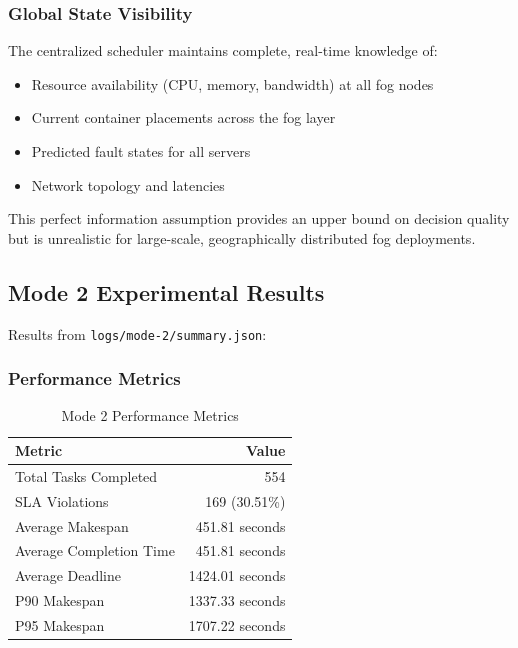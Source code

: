 \documentclass[12pt,a4paper]{article}
\begin{document}
\subsubsection{Global State Visibility}

The centralized scheduler maintains complete, real-time knowledge of:
\begin{itemize}
    \item Resource availability (CPU, memory, bandwidth) at all fog nodes
    \item Current container placements across the fog layer
    \item Predicted fault states for all servers
    \item Network topology and latencies
\end{itemize}

This perfect information assumption provides an upper bound on decision quality but is unrealistic for large-scale, geographically distributed fog deployments.

\subsection{Mode 2 Experimental Results}

Results from \texttt{logs/mode-2/summary.json}:

\subsubsection{Performance Metrics}

\begin{table}[h]
\centering
\begin{tabular}{@{}lr@{}}
\toprule
\textbf{Metric} & \textbf{Value} \\ \midrule
Total Tasks Completed & 554 \\
SLA Violations & 169 (30.51\%) \\
Average Makespan & 451.81 seconds \\
Average Completion Time & 451.81 seconds \\
Average Deadline & 1424.01 seconds \\
P90 Makespan & 1337.33 seconds \\
P95 Makespan & 1707.22 seconds \\ \bottomrule
\end{tabular}
\caption{Mode 2 Performance Metrics}
\label{tab:mode2-performance}
\end{table}
\end{document}

